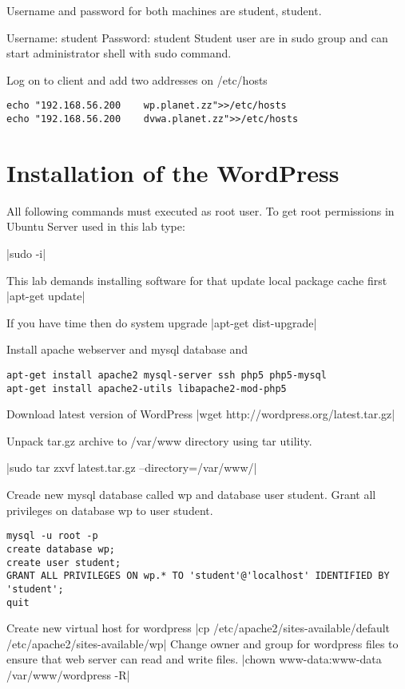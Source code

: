 Username and password for both machines are student, student.

Username: student
Password: student
Student user are in sudo group and can start administrator shell with sudo command.

Log on to client and add two addresses on /etc/hosts
\begin{verbatim}
echo "192.168.56.200	wp.planet.zz">>/etc/hosts
echo "192.168.56.200	dvwa.planet.zz">>/etc/hosts
\end{verbatim}

\section{Installation of the WordPress}
All following commands must executed as root user. To get root permissions in Ubuntu Server used in this lab type:

|sudo -i|


This lab demands installing software for that update local package cache first
|apt-get update|

If you have time then do system upgrade
|apt-get dist-upgrade|

Install apache webserver and mysql database and 
\begin{verbatim}
apt-get install apache2 mysql-server ssh php5 php5-mysql 
apt-get install apache2-utils libapache2-mod-php5
\end{verbatim}

Download latest version of WordPress
|wget http://wordpress.org/latest.tar.gz|

Unpack tar.gz archive to  /var/www directory using tar utility.

|sudo tar zxvf latest.tar.gz --directory=/var/www/|

Creade new mysql database called wp and database user student. Grant all privileges on database wp to user student.

\begin{verbatim}
mysql -u root -p
create database wp;
create user student;
GRANT ALL PRIVILEGES ON wp.* TO 'student'@'localhost' IDENTIFIED BY 'student';
quit
\end{verbatim}

Create new virtual host for wordpress 
|cp /etc/apache2/sites-available/default /etc/apache2/sites-available/wp|
Change owner and group for wordpress files to ensure that web server can read and write files.
|chown www-data:www-data /var/www/wordpress -R|

